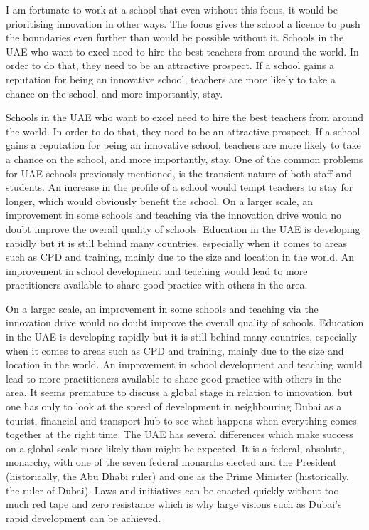 I am fortunate to work at a school that even without this focus, it would be prioritising innovation in other ways. The focus gives the school a licence to push the boundaries even further than would be possible without it. Schools in the UAE who want to excel need to hire the best teachers from around the world. In order to do that, they need to be an attractive prospect. If a school gains a reputation for being an innovative school, teachers are more likely to take a chance on the school, and more importantly, stay. 

Schools in the UAE who want to excel need to hire the best teachers from around the world. In order to do that, they need to be an attractive prospect. If a school gains a reputation for being an innovative school, teachers are more likely to take a chance on the school, and more importantly, stay. 
One of the common problems for UAE schools previously mentioned, is the transient nature of both staff and students. An increase in the profile of a school would tempt teachers to stay for longer, which would obviously benefit the school. On a larger scale, an improvement in some schools and teaching via the innovation drive would no doubt improve the overall quality of schools. Education in the UAE is developing rapidly but it is still behind many countries, especially when it comes to areas such as CPD and training, mainly due to the size and location in the world. An improvement in school development and teaching would lead to more practitioners available to share good practice with others in the area.

On a larger scale, an improvement in some schools and teaching via the innovation drive would no doubt improve the overall quality of schools. Education in the UAE is developing rapidly but it is still behind many countries, especially when it comes to areas such as CPD and training, mainly due to the size and location in the world. An improvement in school development and teaching would lead to more practitioners available to share good practice with others in the area.
It seems premature to discuss a global stage in relation to innovation, but one has only to look at the speed of development in neighbouring Dubai as a tourist, financial and transport hub to see what happens when everything comes together at the right time.
The UAE has several differences which make success on a global scale more likely than might be expected. It is a federal, absolute, monarchy, with one of the seven federal monarchs elected and the President (historically, the Abu Dhabi ruler) and one as the Prime Minister (historically, the ruler of Dubai). Laws and initiatives can be enacted quickly without too much red tape and zero resistance which is why large visions such as Dubai’s rapid development can be achieved.

